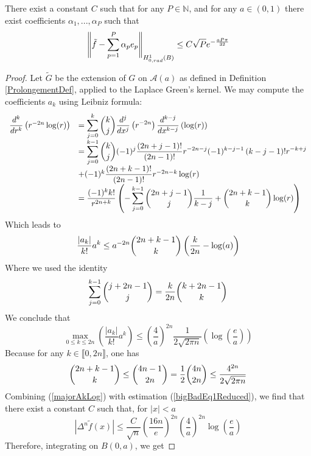 \documentclass[11pt,a4paper]{article}
\begin{document}
\begin{The} There exist a constant $C$ such that for any $P \in \mathbb{N}$, and for any $a \in (0,1)$ there exist coefficients $\alpha_1,...,\alpha_{P}$ such that
\[ \left\|\tilde{f} - \sum_{p=1}^{P}\alpha_p e_p\right\|_{H^1_{0,rad}(B)} \leq C \sqrt{P} e^{-\frac{aP\pi}{32}}\]

\begin{proof}
Let $\tilde{G}$ be the extension of $G$ on $\mathcal{A}(a)$ as defined in Definition \ref{ProlongementDef}, applied to the Laplace Green's kernel. We may compute the coefficients $a_k$ using Leibniz formula: 
\[\begin{array}{rl}

\dfrac{d^k }{dr^k}\left(r^{-2n}\log(r)\right) &= \displaystyle\sum_{j=0}^k\dbinom{k}{j}\dfrac{d^j}{dx^j}\left(r^{-2n}\right)\dfrac{d^{k-j}}{dx^{k-j}}\left(\log(r)\right)\\
&= \displaystyle\sum_{j=0}^{k-1} \dbinom{k}{j}(-1)^j \dfrac{(2n+j-1)!}{(2n-1)!}r^{-2n-j}(-1)^{k-j-1}\left(k-j-1\right)!r^{-k+j}\\ & + (-1)^k \dfrac{(2n+k-1)!}{(2n-1)!}r^{-2n-k}\log(r)\\
& = \dfrac{(-1)^k k!}{r^{2n+k}} \left(-\displaystyle\sum_{j=0}^{k-1}\dbinom{2n+j-1}{j}\dfrac{1}{k-j}+\dbinom{2n+k-1}{k}\log(r)\right)
\end{array}\]
Which leads to \[\dfrac{|a_k|}{k!}a^k \leq a^{-2n} \dbinom{2n + k -1}{k}\left(\frac{k}{2n}-\log(a)\right)\]
Where we used the identity 
\begin{equation}
\sum_{j=0}^{k-1}\dbinom{j+2n-1}{j} = \dfrac{k}{2n}\dbinom{k+2n-1}{k}
\label{sommekparmminplusk}
\end{equation}
We conclude that \begin{equation}
\max_{0\leq k \leq 2n}\left(\dfrac{|a_k|}{k!}a^k\right) \leq \left(\frac{4}{a}\right)^{2n}\dfrac{1}{2\sqrt{2\pi n}}\left(\log\left(\frac{e}{a}\right)\right)
\label{majorAkLog} 
\end{equation}
Because for any $k \in \llbracket 0,2n\rrbracket$, one has 
\begin{equation}
\dbinom{2n+k-1}{k}\leq \dbinom{4n-1}{2n} = \frac{1}{2}\dbinom{4n}{2n} \leq \dfrac{4^{2n}}{2\sqrt{2\pi n}}
\label{nparmi2n}
\end{equation}
Combining (\ref{majorAkLog}) with estimation (\ref{bigBadEq1Reduced}), we find that there exist a constant $C$ such that, for $|x|<a$
\[|\Delta^n \tilde{f} (x)|\leq \dfrac{C}{\sqrt{n}}\left( \frac{16n}{e}\right)^{2n}\left(\frac{4}{a}\right)^{2n}\log\left(\dfrac{e}{a}\right)  \]
Therefore, integrating on $B(0,a)$, we get

\end{proof}
\end{The}
\end{document}
